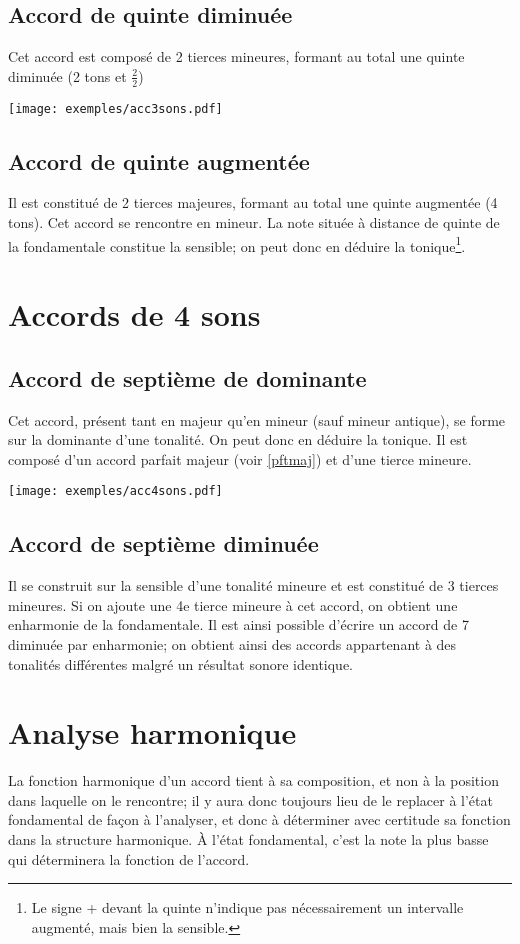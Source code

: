 \documentclass[11pt]{scrreprt}
\begin{document}
\subsection{Accord de quinte diminuée}
Cet accord est composé de 2 tierces mineures, formant au total une quinte diminuée (2 tons et $\frac2 2$)
\begin{center}
   \texttt{[image: exemples/acc3sons.pdf]}
\end{center}
\subsection{Accord de quinte augmentée}
Il est constitué de 2 tierces majeures, formant au total une quinte augmentée (4 tons). Cet accord se rencontre en mineur. La note située à distance de quinte de la fondamentale constitue la sensible; on peut donc en déduire la tonique\footnote{Le signe + devant la quinte n'indique pas nécessairement un intervalle augmenté, mais bien la sensible.}.
\section{Accords de 4 sons}
\subsection{Accord de septième de dominante}
Cet accord, présent tant en majeur qu'en mineur (sauf mineur antique), se forme sur la dominante d'une tonalité. On peut donc en déduire la tonique. Il est composé d'un accord parfait majeur (voir \ref{pftmaj}) et d'une tierce mineure.
\begin{center}
   \texttt{[image: exemples/acc4sons.pdf]}
\end{center}
\subsection{Accord de septième diminuée}
Il se construit sur la sensible d'une tonalité mineure et est constitué de 3 tierces mineures. Si on ajoute une 4e tierce mineure à cet accord, on obtient une enharmonie de la fondamentale. Il est ainsi possible d'écrire un accord de 7\ieme{} diminuée par enharmonie; on obtient ainsi des accords appartenant à des tonalités différentes malgré un résultat sonore identique.
\section{Analyse harmonique}
La fonction harmonique d'un accord tient à sa composition, et non à la position dans laquelle on le rencontre; il y aura donc toujours lieu de le replacer à l'état fondamental de façon à l'analyser, et donc à déterminer avec certitude sa fonction dans la structure harmonique. À l'état fondamental, c'est la note la plus basse qui déterminera la fonction de l'accord.
\end{document}
